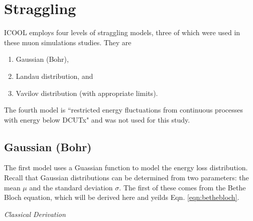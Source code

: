 \section{Straggling} \label{sec:ICOOLStraggling}
ICOOL \cite{icool} employs four levels of straggling models, three of which were used in these muon simulations studies. They are
\begin{enumerate}
\item{Gaussian (Bohr)},
\item{Landau distribution}, and
\item{Vavilov distribution (with appropriate limits)}.
\end{enumerate}
The fourth model is ``restricted energy fluctuations from continuous processes with energy below DCUTx" and was not used for this study.

\subsection{Gaussian (Bohr)} \label{ssc:ICOOLStragglingGaussian}

The first model uses a Guassian function to model the energy loss distribution. Recall that Gaussian distributions can be determined from two parameters: the mean $\mu$ and the standard deviation $\sigma$. The first of these comes from the Bethe Bloch equation, which will be derived here and yeilds Eqn. \ref{eqn:bethebloch}. 

\vspace{24pt}
\noindent \textit{\large Classical Derivation}
\vspace{12pt}

